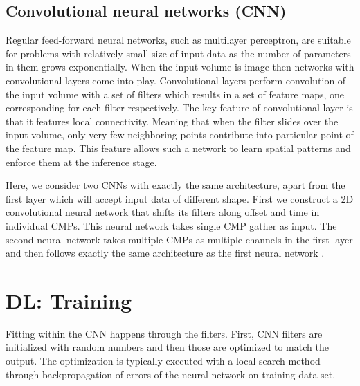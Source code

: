 \documentclass[paper,twocolomn]{geophysics}
\begin{document}
\subsection{Convolutional neural networks (CNN)}
Regular feed-forward neural networks, such as multilayer perceptron, are suitable for problems with relatively small size of input data as the number of parameters in them grows exponentially. When the input volume is image then networks with convolutional layers come into play. Convolutional layers perform convolution of the input volume with a set of filters which results in a set of feature maps, one corresponding for each filter respectively. The key feature of convolutional layer is that it features local connectivity. Meaning that when the filter slides over the input volume, only very few neighboring points contribute into particular point of the feature map. This feature allows such a network to learn spatial patterns and enforce them at the inference stage.

Here, we consider two CNNs with exactly the same architecture, apart from the first layer which will accept input data of different shape.
%
First we construct a 2D convolutional neural network that shifts its filters along offset and time in individual CMPs. This neural network takes single CMP gather as input.
The second neural network takes multiple CMPs as multiple channels in the first layer and then follows exactly the same architecture as the first neural network .









\section{DL: Training}
Fitting within the CNN happens through the filters. First, CNN filters are initialized with random numbers and then those are optimized to match the output. The optimization is typically executed with a local search method through backpropagation of errors of the neural network on training data set. 
\end{document}
